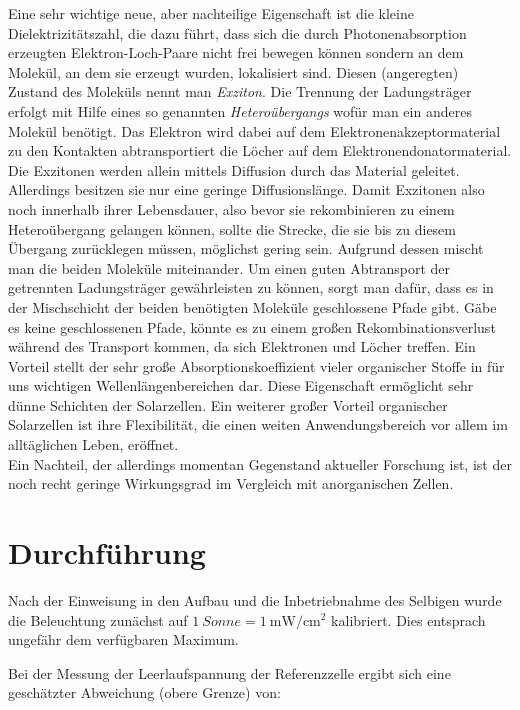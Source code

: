 \documentclass[slug=SZ, room=Hermann-Krone-Bau\,\ Labor\ 1.25,
supervisor=Martin\ Kroll, coursedate=14.\ 11.\ 2019]{../../Lab_Report_LaTeX/lab_report}
\newcommand{\sun}[1]{\SI{#1}{Sonne}}
\newcommand{\mwcm}[1]{\SI{#1}{\milli\watt\per\centi\meter^2}}
\begin{document}
Eine sehr wichtige neue, aber nachteilige Eigenschaft ist die kleine
Dielektrizitätszahl, die dazu führt, dass sich die durch
Photonenabsorption erzeugten Elektron-Loch-Paare nicht frei bewegen
können sondern an dem Molekül, an dem sie erzeugt wurden, lokalisiert
sind. Diesen (angeregten) Zustand des Moleküls nennt man
\emph{Exziton}.  Die Trennung der Ladungsträger erfolgt mit Hilfe
eines so genannten \emph{Heteroübergangs} wofür man ein anderes
Molekül benötigt. Das Elektron wird dabei auf dem
Elektronenakzeptormaterial zu den Kontakten abtransportiert die Löcher
auf dem Elektronendonatormaterial.  Die Exzitonen werden allein
mittels Diffusion durch das Material geleitet. Allerdings besitzen sie
nur eine geringe Diffusionslänge. Damit Exzitonen also noch innerhalb
ihrer Lebensdauer, also bevor sie rekombinieren zu einem
Heteroübergang gelangen können, sollte die Strecke, die sie bis zu
diesem Übergang zurücklegen müssen, möglichst gering sein. Aufgrund
dessen mischt man die beiden Moleküle miteinander.  Um einen guten
Abtransport der getrennten Ladungsträger gewährleisten zu können,
sorgt man dafür, dass es in der Mischschicht der beiden benötigten
Moleküle geschlossene Pfade gibt. Gäbe es keine geschlossenen Pfade,
könnte es zu einem großen Rekombinationsverlust während des Transport
kommen, da sich Elektronen und Löcher treffen.  Ein Vorteil stellt der
sehr große Absorptionskoeffizient vieler organischer Stoffe in für uns
wichtigen Wellenlängenbereichen dar. Diese Eigenschaft erm\"oglicht
sehr dünne Schichten der Solarzellen.  Ein weiterer großer Vorteil
organischer Solarzellen ist ihre Flexibilität, die einen weiten
Anwendungsbereich
vor allem im alltäglichen Leben, eröffnet.\\

Ein Nachteil, der allerdings momentan Gegenstand aktueller Forschung ist, ist der noch recht geringe
Wirkungsgrad im Vergleich mit anorganischen Zellen.


\section{Durchf\"uhrung}
\label{sec:durchf}

Nach der Einweisung in den Aufbau und die Inbetriebnahme des Selbigen
wurde die Beleuchtung zun\"achst auf $\sun{1}=\mwcm{1}$
kalibriert. Dies entsprach ungef\"ahr dem verf\"ugbaren Maximum.

Bei der Messung der Leerlaufspannung der Referenzzelle ergibt sich eine
gesch\"atzter Abweichung (obere Grenze) von:
\end{document}
